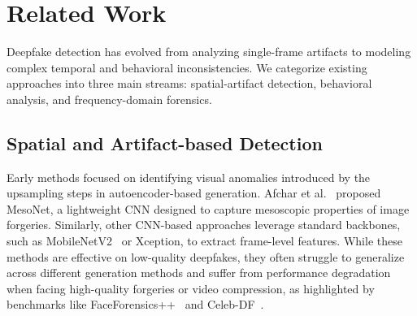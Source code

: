 \documentclass[conference]{IEEEtran}
\begin{document}


\section{Related Work}

Deepfake detection has evolved from analyzing single-frame artifacts to modeling complex temporal and behavioral inconsistencies. We categorize existing approaches into three main streams: spatial-artifact detection, behavioral analysis, and frequency-domain forensics.

\subsection{Spatial and Artifact-based Detection}
Early methods focused on identifying visual anomalies introduced by the upsampling steps in autoencoder-based generation. Afchar et al.~\cite{b1} proposed MesoNet, a lightweight CNN designed to capture mesoscopic properties of image forgeries. Similarly, other CNN-based approaches leverage standard backbones, such as MobileNetV2~\cite{b17} or Xception, to extract frame-level features. While these methods are effective on low-quality deepfakes, they often struggle to generalize across different generation methods and suffer from performance degradation when facing high-quality forgeries or video compression, as highlighted by benchmarks like FaceForensics++~\cite{b8} and Celeb-DF~\cite{b2,b14}.
\end{document}
